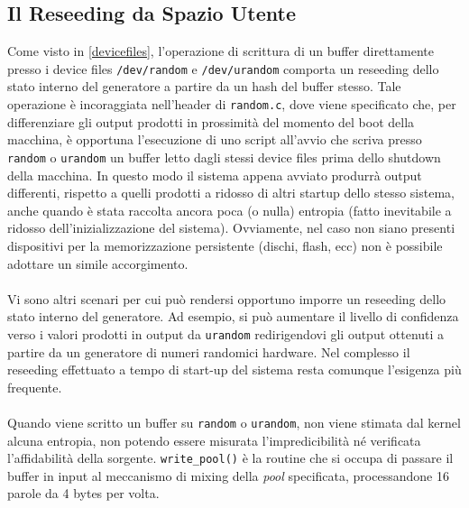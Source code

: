 \documentclass{article}
\begin{document}
 \subsection{Il Reseeding da Spazio Utente}\label{reseeding}
 Come visto in \ref{devicefiles}, l'operazione di scrittura di un buffer
 direttamente presso i device files \verb+/dev/random+ e \verb+/dev/urandom+
 comporta un reseeding dello stato interno del generatore a partire da un hash
 del buffer stesso. Tale operazione è incoraggiata nell'header di
 \verb+random.c+, dove viene specificato che, per differenziare gli output
 prodotti in prossimità del momento del boot della macchina, è opportuna
 l'esecuzione di uno script all'avvio che scriva presso \verb+random+ o
 \verb+urandom+ un buffer letto dagli stessi device files prima dello shutdown
 della macchina. In questo modo il sistema appena avviato produrrà output
 differenti, rispetto a quelli prodotti a ridosso di altri startup dello stesso
 sistema, anche quando è stata raccolta ancora poca (o nulla) entropia
 (fatto inevitabile a ridosso dell'inizializzazione del sistema).
 Ovviamente, nel caso non siano presenti dispositivi per la memorizzazione
 persistente (dischi, flash, ecc) non è possibile adottare un simile
 accorgimento.
 \paragraph{} Vi sono altri scenari per cui può rendersi opportuno imporre
 un reseeding dello stato interno del generatore. Ad esempio, si può aumentare
 il livello di confidenza verso i valori prodotti in output da \verb+urandom+
 redirigendovi gli output ottenuti a partire da un generatore di numeri
 randomici hardware. Nel complesso il reseeding effettuato a tempo di start-up
 del sistema resta comunque l'esigenza più frequente.
 \paragraph{}Quando viene scritto un buffer su \verb+random+ o \verb+urandom+,
 non viene stimata dal kernel alcuna entropia, non potendo essere misurata
 l'impredicibilità né verificata l'affidabilità della sorgente.
 \newline \verb+write_pool()+ è la routine che si occupa di passare il buffer in
 input al meccanismo di mixing della \emph{pool} specificata, processandone 16 parole
 da 4 bytes per volta.
 

 
\end{document}
